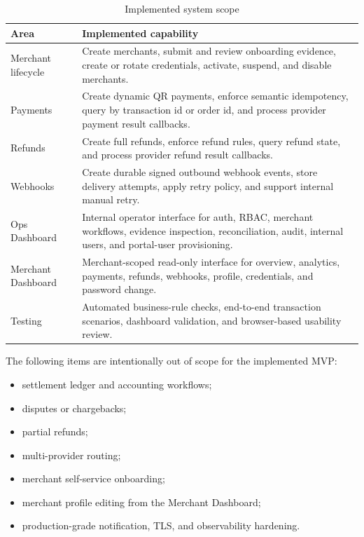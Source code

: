 \begin{table}[!htbp]
\centering
\caption{Implemented system scope}
\begin{tabularx}{\textwidth}{L{0.24\textwidth}Y}
\toprule
\textbf{Area} & \textbf{Implemented capability} \\
\midrule
Merchant lifecycle & Create merchants, submit and review onboarding evidence, create or rotate credentials, activate, suspend, and disable merchants. \\
\bodyrowrule
Payments & Create dynamic QR payments, enforce semantic idempotency, query by transaction id or order id, and process provider payment result callbacks. \\
\bodyrowrule
Refunds & Create full refunds, enforce refund rules, query refund state, and process provider refund result callbacks. \\
\bodyrowrule
Webhooks & Create durable signed outbound webhook events, store delivery attempts, apply retry policy, and support internal manual retry. \\
\bodyrowrule
Ops Dashboard & Internal operator interface for auth, RBAC, merchant workflows, evidence inspection, reconciliation, audit, internal users, and portal-user provisioning. \\
\bodyrowrule
Merchant Dashboard & Merchant-scoped read-only interface for overview, analytics, payments, refunds, webhooks, profile, credentials, and password change. \\
\bodyrowrule
Testing & Automated business-rule checks, end-to-end transaction scenarios, dashboard validation, and browser-based usability review. \\
\bottomrule
\end{tabularx}
\end{table}

The following items are intentionally out of scope for the implemented MVP:

\begin{itemize}
  \item settlement ledger and accounting workflows;
  \item disputes or chargebacks;
  \item partial refunds;
  \item multi-provider routing;
  \item merchant self-service onboarding;
  \item merchant profile editing from the Merchant Dashboard;
  \item production-grade notification, TLS, and observability hardening.
\end{itemize}

